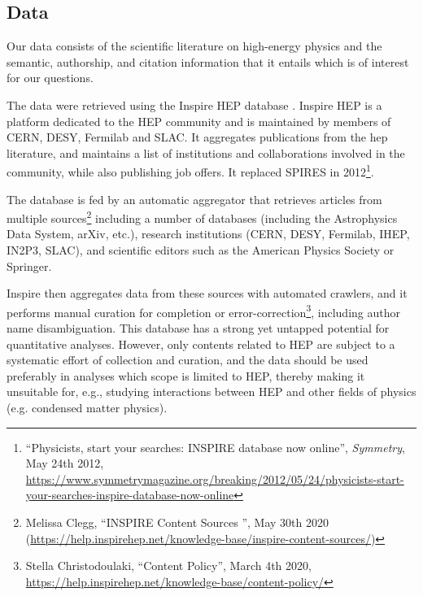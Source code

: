 \documentclass[smallextended]{svjour3}
\begin{document}
\subsection{Data\label{section:data}}


Our data consists of the scientific literature on high-energy physics and the semantic, authorship, and citation information that it entails which is of interest for our questions.
 
The data were retrieved using the Inspire HEP database \citep{InspireAPI}. Inspire HEP is a platform dedicated to the HEP community and is maintained by members of CERN, DESY, Fermilab and SLAC. It aggregates publications from the \gls{hep} literature, and maintains a list of institutions and collaborations involved in the community, while also publishing job offers. It replaced SPIRES in 2012\footnote{``Physicists, start your searches: INSPIRE database now online'', \textit{Symmetry}, May 24th 2012, \url{https://www.symmetrymagazine.org/breaking/2012/05/24/physicists-start-your-searches-inspire-database-now-online}
}.

The database is fed by an automatic aggregator that retrieves articles from multiple sources\footnote{Melissa Clegg, ``INSPIRE Content Sources
'', May 30th 2020 (\url{https://help.inspirehep.net/knowledge-base/inspire-content-sources/})} including a number of databases (including the Astrophysics Data System, arXiv, etc.), research institutions (CERN, DESY, Fermilab, IHEP, IN2P3, SLAC), and scientific editors such as the American Physics Society or Springer.

Inspire then aggregates data from these sources with automated crawlers, and it performs manual curation for completion or error-correction\footnote{Stella Christodoulaki, ``Content Policy'', March 4th 2020, \url{https://help.inspirehep.net/knowledge-base/content-policy/}}, including author name disambiguation. This database has a strong yet untapped potential for quantitative analyses. However, only contents related to HEP are subject to a systematic effort of collection and curation, and the data should be used preferably in analyses which scope is limited to HEP, thereby making it unsuitable for, e.g., studying interactions between HEP and other fields of physics (e.g. condensed matter physics).%
\end{document}
